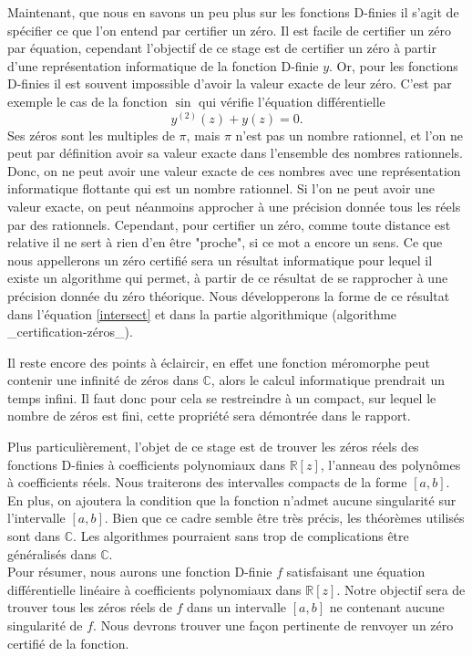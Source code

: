 \documentclass[a4paper,10pt]{article}
\begin{document}
	Maintenant, que nous en savons un peu plus sur les fonctions D-finies il s'agit de spécifier ce que l'on entend par certifier un zéro. Il est facile de certifier un zéro par équation, cependant l'objectif de ce stage est de certifier un zéro à partir d'une représentation informatique de la fonction D-finie $y$. Or, pour les fonctions D-finies il est souvent impossible d'avoir la valeur exacte de leur zéro. C'est par exemple le cas de la fonction $\sin$ qui vérifie l'équation différentielle
	\[y^{(2)}(z)+y(z)=0.\]
	Ses zéros sont les multiples de $\pi$, mais $\pi$ n'est pas un nombre rationnel, et l'on ne peut par définition avoir sa valeur exacte dans l'ensemble des nombres rationnels. Donc, on ne peut avoir une valeur exacte de ces nombres avec une représentation informatique flottante qui est un nombre rationnel. Si l'on ne peut avoir une valeur exacte, on peut néanmoins approcher à une précision donnée tous les réels par des rationnels. Cependant, pour certifier un zéro, comme toute distance est relative il ne sert à rien d'en être "proche", si ce mot a encore un sens. Ce que nous appellerons un zéro certifié sera un résultat informatique pour lequel il existe un algorithme qui permet, à partir de ce résultat de se rapprocher à une précision donnée du zéro théorique. Nous développerons la forme de ce résultat dans l'équation \eqref{intersect} et dans la partie algorithmique (algorithme \_certification-zéros\_).
	
	Il reste encore des points à éclaircir, en effet une fonction méromorphe peut contenir une infinité de zéros dans $\mathbb{C}$, alors le calcul informatique prendrait un temps infini. Il faut donc pour cela se restreindre à un compact, sur lequel le nombre de zéros est fini, cette propriété sera démontrée dans le rapport.
	
	Plus particulièrement, l'objet de ce stage est de trouver les zéros réels des fonctions D-finies à coefficients polynomiaux dans $\mathbb{R}[z]$, l'anneau des polynômes à coefficients réels. Nous traiterons des intervalles compacts de la forme $[a,b]$. En plus, on ajoutera la condition que la fonction n'admet aucune singularité sur l'intervalle $[a,b]$.
	Bien que ce cadre semble être très précis, les théorèmes utilisés sont dans $\mathbb{C}$. Les algorithmes pourraient sans trop de complications être généralisés dans $\mathbb{C}$.
	\\
	
	Pour résumer, nous aurons une fonction D-finie $f$ satisfaisant une équation différentielle linéaire à coefficients polynomiaux dans $\mathbb{R}[z]$. Notre objectif sera de trouver tous les zéros réels de $f$ dans un intervalle $[a,b]$ ne contenant aucune singularité de $f$. Nous devrons trouver une façon pertinente de renvoyer un zéro certifié de la fonction.
	
\end{document}
